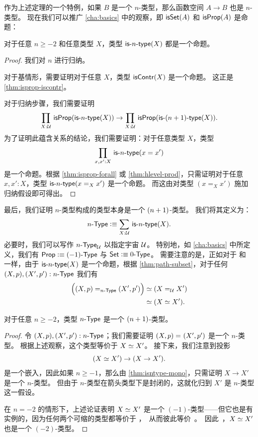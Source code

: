 作为上述定理的一个特例，如果 $B$ 是一个 $n$-类型，那么函数空间 $A \to B$ 也是 $n$-类型。
现在我们可以推广 \cref{cha:basics} 中的观察，即 $\isset(A)$ 和 $\isprop(A)$ 是命题：

\begin{thm}\label{thm:isaprop-isofhlevel}
 对于任意 $n \geq -2$ 和任意类型 $X$，类型 $\istype{n}(X)$ 都是一个命题。
\end{thm}

\begin{proof}
  我们对 $n$ 进行归纳。

 对于基情形，需要证明对于任意 $X$，类型 $\iscontr(X)$ 是一个命题。
 这正是 \cref{thm:isprop-iscontr}。

对于归纳步骤，我们需要证明
\[\prd{X : \type} \isprop (\istype{n}(X)) \to \prd{X : \type} \isprop (\istype{\nplusone}(X)). \]
为了证明此蕴含关系的结论，我们需要证明：对于任意类型 $X$，类型
\[\prd{x, x' : X}\istype{n}(x = x')\]
是一个命题。根据 \cref{thm:isprop-forall} 或 \cref{thm:hlevel-prod}，只需证明对于任意 $x, x' : X$，类型 $\istype{n}(x =_X x')$ 是一个命题。
而这由对类型 $(x =_X x')$ 施加归纳假设即可得出。
\end{proof}

最后，我们证明 $n$-类型构成的类型本身是一个 $\nplusone$-类型。
我们将其定义为：
\[\ntype{n} \defeq \sm{X : \type} \istype{n}(X). \]
必要时，我们可以写作 $\ntypeU{n}$ 以指定宇宙 $\UU$。
特别地，如 \cref{cha:basics} 中所定义，我们有 $\prop \defeq \ntype{(-1)}$ 与 $\set \defeq \ntype{0}$。
需要注意的是，正如对于 \prop 和 \set 一样，由于 $\istype{n}(X)$ 是一个命题，根据 \cref{thm:path-subset}，对于任何 $(X,p), (X',p'):\ntype{n}$ 我们有
\begin{align*}
  \Big(\id[\ntype{n}]{(X, p)}{(X', p')}\Big) &\eqvsym (\id[\type] X X')\\
  &\eqvsym (\eqv{X}{X'}).
\end{align*}

\begin{thm}\label{thm:hleveln-of-hlevelSn}
 对于任意 $n \geq -2$，类型 $\ntype{n}$ 是一个 $\nplusone$-类型。
\end{thm}

\begin{proof}%
  令 $(X, p), (X', p') : \ntype{n}$；我们需要证明 $\id{(X, p)}{(X', p')}$ 是一个 $n$-类型。
  根据上述观察，这个类型等价于 $\eqv{X}{X'}$。
  接下来，我们注意到投影
  \[(\eqv{X}{X'}) \to (X \rightarrow X').\]
  是一个嵌入，因此如果 $n\geq -1$，那么由 \cref{thm:isntype-mono}，只需证明 $X \rightarrow X'$ 是一个 $n$-类型。
  但由于 $n$-类型在箭头类型下是封闭的，这就化归到 $X'$ 是 $n$-类型这一假设。

  在 $n=-2$ 的情形下，上述论证表明 $\eqv{X}{X'}$ 是一个 $(-1)$-类型——但它也是有实例的，因为任何两个可缩的类型都等价于 \unit，从而彼此等价。
  因此，$\eqv{X}{X'}$ 也是一个 $(-2)$-类型。
\end{proof}

